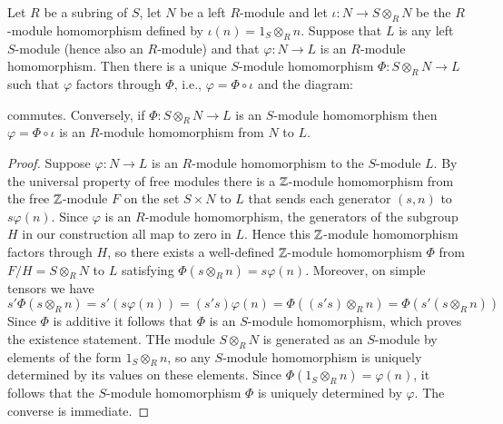 \documentclass[12pt, a4paper, oneside, openright, titlepage]{book}
\begin{document}
\begin{thm}
    Let $R$ be a subring of $S$, let $N$ be a left $R$-module and let $\iota:N\rightarrow S\otimes_RN$ be the $R$-module homomorphism defined by $\iota(n) = 1_S\otimes_Rn$. Suppose that $L$ is any left $S$-module (hence also an $R$-module) and that $\varphi:N\rightarrow L$ is an $R$-module homomorphism. Then there is a unique $S$-module homomorphism $\Phi:S\otimes_R N\rightarrow L$ such that $\varphi$ factors through $\Phi$, i.e., $\varphi = \Phi \circ \iota$ and the diagram:
    \begin{center}
    \end{center}
    commutes. Conversely, if $\Phi:S\otimes_RN\rightarrow L$ is an $S$-module homomorphism then $\varphi = \Phi\circ \iota$ is an $R$-module homomorphism from $N$ to $L$.
\end{thm}
\begin{proof}
    Suppose $\varphi:N\rightarrow L$ is an $R$-module homomorphism to the $S$-module $L$. By the universal property of free modules there is a $\mathbb Z$-module homomorphism from the free $\mathbb Z$-module $F$ on the set $S\times N$ to $L$ that sends each generator $(s,n)$ to $s\varphi(n)$. Since $\varphi$ is an $R$-module homomorphism, the generators of the subgroup $H$ in our construction all map to zero in $L$. Hence this $\mathbb Z$-module homomorphism factors through $H$, so there exists a well-defined $\mathbb Z$-module homomorphism $\Phi$ from $F/H = S\otimes_RN$ to $L$ satisfying $\Phi(s\otimes_Rn) = s\varphi(n)$. Moreover, on simple tensors we have \begin{equation*}
        s'\Phi(s\otimes_Rn) = s'(s\varphi(n)) = (s's)\varphi(n) = \Phi((s's)\otimes_Rn) = \Phi(s'(s\otimes_Rn))
    \end{equation*}
    Since $\Phi$ is additive it follows that $\Phi$ is an $S$-module homomorphism, which proves the existence statement. THe module $S\otimes_RN$ is generated as an $S$-module by elements of the form $1_S\otimes_Rn$, so any $S$-module homomorphism is uniquely determined by its values on these elements. Since $\Phi(1_S\otimes_Rn) = \varphi(n)$, it follows that the $S$-module homomorphism $\Phi$ is uniquely determined by $\varphi$. The converse is immediate.
\end{proof}
\end{document}
